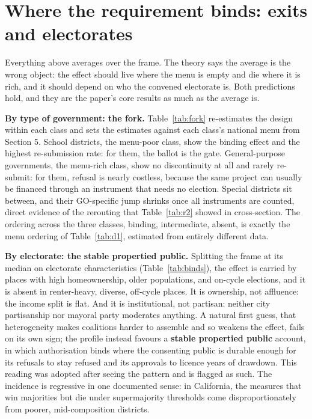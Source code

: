 \section{Where the requirement binds: exits and electorates}
Everything above averages over the frame. The theory says the average is the wrong object: the effect should live where the menu is empty and die where it is rich, and it should depend on who the convened electorate is. Both predictions hold, and they are the paper's core results as much as the average is.

\textbf{By type of government: the fork.} Table~\ref{tab:fork} re-estimates the design within each class and sets the estimates against each class's national menu from Section 5. School districts, the menu-poor class, show the binding effect and the highest re-submission rate: for them, the ballot is the gate. General-purpose governments, the menu-rich class, show no discontinuity at all and rarely re-submit: for them, refusal is nearly costless, because the same project can usually be financed through an instrument that needs no election. Special districts sit between, and their GO-specific jump shrinks once all instruments are counted, direct evidence of the rerouting that Table~\ref{tab:r2} showed in cross-section. The ordering across the three classes, binding, intermediate, absent, is exactly the menu ordering of Table~\ref{tab:d1}, estimated from entirely different data.


\textbf{By electorate: the stable propertied public.} Splitting the frame at its median on electorate characteristics (Table~\ref{tab:binds}), the effect is carried by places with high homeownership, older populations, and on-cycle elections, and it is absent in renter-heavy, diverse, off-cycle places. It is ownership, not affluence: the income split is flat. And it is institutional, not partisan: neither city partisanship nor mayoral party moderates anything. A natural first guess, that heterogeneity makes coalitions harder to assemble and so weakens the effect, fails on its own sign; the profile instead favours a \textbf{stable propertied public} account, in which authorisation binds where the consenting public is durable enough for its refusals to stay refused and its approvals to licence years of drawdown. This reading was adopted after seeing the pattern and is flagged as such. The incidence is regressive in one documented sense: in California, the measures that win majorities but die under supermajority thresholds come disproportionately from poorer, mid-composition districts.


